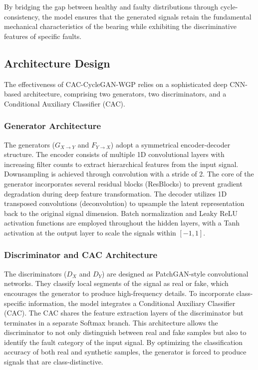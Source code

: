 By bridging the gap between healthy and faulty distributions through cycle-consistency, the model ensures that the generated signals retain the fundamental mechanical characteristics of the bearing while exhibiting the discriminative features of specific faults.

\subsection{Architecture Design}
The effectiveness of CAC-CycleGAN-WGP relies on a sophisticated deep CNN-based architecture, comprising two generators, two discriminators, and a Conditional Auxiliary Classifier (CAC).

\subsubsection{Generator Architecture}
The generators ($G_{X \to Y}$ and $F_{Y \to X}$) adopt a symmetrical encoder-decoder structure. The encoder consists of multiple 1D convolutional layers with increasing filter counts to extract hierarchical features from the input signal. Downsampling is achieved through convolution with a stride of 2. The core of the generator incorporates several residual blocks (ResBlocks) to prevent gradient degradation during deep feature transformation. The decoder utilizes 1D transposed convolutions (deconvolution) to upsample the latent representation back to the original signal dimension. Batch normalization and Leaky ReLU activation functions are employed throughout the hidden layers, with a Tanh activation at the output layer to scale the signals within $[-1, 1]$.

\subsubsection{Discriminator and CAC Architecture}
The discriminators ($D_X$ and $D_Y$) are designed as PatchGAN-style convolutional networks. They classify local segments of the signal as real or fake, which encourages the generator to produce high-frequency details. To incorporate class-specific information, the model integrates a Conditional Auxiliary Classifier (CAC). The CAC shares the feature extraction layers of the discriminator but terminates in a separate Softmax branch. This architecture allows the discriminator to not only distinguish between real and fake samples but also to identify the fault category of the input signal. By optimizing the classification accuracy of both real and synthetic samples, the generator is forced to produce signals that are class-distinctive.

